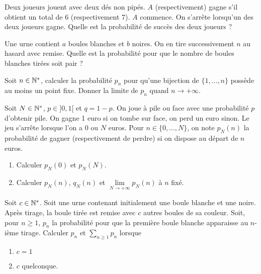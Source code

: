 \begin{exercise}
	Deux joueurs jouent avec deux dés non pipés. $A$ (respectivement) gagne s'il
	obtient un total de 6 (respectivement 7). $A$ commence. On s'arrête lorsqu'un
	des deux joueurs gagne. Quelle est la probabilité de succès des deux joueurs ?
\end{exercise}

\begin{exercise}
	Une urne contient $a$ boules blanches et $b$ noires. On en tire successivement
	$n$ au hasard avec remise. Quelle est la probabilité pour que le nombre de
	boules blanches tirées soit pair ?
\end{exercise}

\begin{exercise}
	Soit $n\in\mathbb{N}^{*}$, calculer la probabilité $p_{n}$ pour qu'une bijection de
	$\{1,\dots,n\}$ possède au moins un point fixe. Donner la limite de $p_{n}$
	quand $n\to+\infty$.
\end{exercise}

\begin{exercise}
	Soit $N\in\mathbb{N}^{*}$, $p\in]0,1[$ et $q=1-p$. On joue à pile ou face avec une
	probabilité $p$ d'obtenir pile. On gagne 1 euro si on tombe sur face, on perd
	un euro sinon. Le jeu s'arrête lorsque l'on a 0 ou $N$ euros. Pour
	$n\in\{0,\dots,N\}$, on note $p_{N}(n)$ la probabilité de gagner
	(respectivement de perdre) si on dispose au départ de $n$ euros.
	\begin{enumerate}
		\item
		Calculer $p_{N}(0)$ et $p_{N}(N)$.
		\item
		Calculer $p_{N}(n)$, $q_{N}(n)$ et $\lim\limits_{N\to+\infty}p_{N}(n)$ à
		$n$ fixé.
	\end{enumerate}
\end{exercise}

\begin{exercise}
	Soit $c\in\mathbb{N}^{*}$. Soit une urne contenant initialement une boule blanche et
	une noire. Après tirage, la boule tirée est remise avec $c$ autres boules de
	sa couleur. Soit, pour $n\geqslant1$, $p_{n}$ la probabilité pour que la
	première boule blanche apparaisse au $n$-ième tirage. Calculer $p_{n}$ et
	$\sum_{n\geqslant1}p_{n}$ lorsque 
	\begin{enumerate}
		\item
		$c=1$
		\item
		$c$ quelconque.
	\end{enumerate}
\end{exercise}

